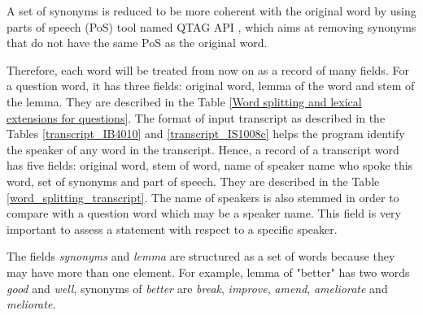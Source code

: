 A set of synonyms is reduced to be more coherent with the original word by using parts of speech (PoS) tool named QTAG API \cite{manson1997qpp}, which aims at removing synonyms that do not have the same PoS as the original word.

Therefore, each word will be treated from now on as a record of many fields. For a question word, it has three fields: original word, lemma of the word and stem of the lemma. They are described in the Table \ref{Word splitting and lexical extensions for questions}. The format of input transcript as described in the Tables \ref{transcript_IB4010} and \ref{transcript_IS1008c} helps the program identify the speaker of any word in the transcript. Hence, a record of a transcript word has five fields: original word, stem of word, name of speaker name who spoke this word, set of synonyms and part of speech. They are described in the Table \ref{word_splitting_transcript}. The name of speakers is also stemmed in order to compare with a question word which may be a speaker name. This field is very important to assess a statement with respect to a specific speaker.

The fields \textit{synonyms} and \textit{lemma} are structured as a set of words because they may have more than one element. For example, lemma of "better" has two words \textit{good} and \textit{well}, synonyms of \textit{better} are \textit{break}, \textit{improve}, \textit{amend}, \textit{ameliorate} and \textit{meliorate}.


